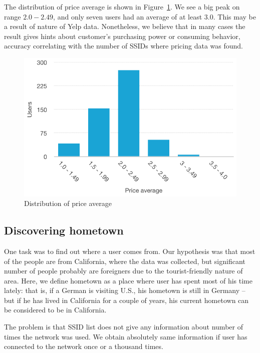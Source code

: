 \documentclass[12pt,a4paper,oneside,pdftex]{report}
\begin{document}
The distribution of price average is shown in Figure~\ref{fig:prices_users}. We see a big peak on range $2.0 - 2.49$, and only seven users had an average of at least 3.0. This may be a result of nature of Yelp data. Nonetheless, we believe that in many cases the result gives hints about customer's purchasing power or consuming behavior, accuracy correlating with the number of SSIDs where pricing data was found.

\begin{figure}
    \center
    \includegraphics{images/prices_users}
    \caption{Distribution of price average}
    \label{fig:prices_users}
\end{figure}

\subsection{Discovering hometown}
\label{sec:practical_geolocation}

One task was to find out where a user comes from. Our hypothesis was that most of the people are from California, where the data was collected, but significant number of people probably are foreigners due to the tourist-friendly nature of area. Here, we define hometown as a place where user has spent most of his time lately: that is, if a German is visiting U.S., his hometown is still in Germany -- but if he has lived in California for a couple of years, his current hometown can be considered to be in California.

The problem is that SSID list does not give any information about number of times the network was used. We obtain absolutely same information if user has connected to the network once or a thousand times.
\end{document}
